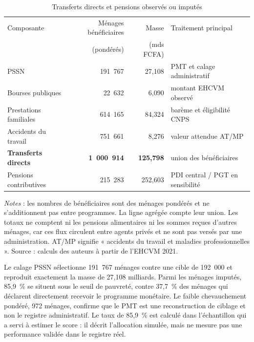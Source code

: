 \documentclass[11pt,a4paper]{article}
\begin{document}
\begin{table}[t]
\centering
\begin{threeparttable}
\caption{Transferts directs et pensions observés ou imputés}
\label{tab:transfers}
\small
\begin{tabular}{lrrl}
\toprule
Composante & Ménages bénéficiaires & Masse & Traitement principal \\
           & (pondérés) & (mds FCFA) & \\
\midrule
PSSN                       & 191~767 &  27,108 & PMT et calage administratif \\
Bourses publiques          &  22~632 &   6,090 & montant EHCVM observé \\
Prestations familiales     & 614~165 &  84,324 & barème et éligibilité CNPS \\
Accidents du travail       & 751~661 &   8,276 & valeur attendue AT/MP \\
\textbf{Transferts directs} & \textbf{1~000~914} & \textbf{125,798} & union des bénéficiaires \\
Pensions contributives     & 215~283 & 252,603 & PDI central / PGT en sensibilité \\
\bottomrule
\end{tabular}
\begin{tablenotes}\footnotesize
\item \emph{Notes} : les nombres de bénéficiaires sont des ménages pondérés et
ne s'additionnent pas entre programmes. La ligne agrégée compte leur union. Les
totaux ne comptent ni les pensions alimentaires ni les sommes reçues d'autres
ménages, car ces flux circulent entre agents privés et ne sont pas versés par
une administration. AT/MP signifie
« accidents du travail et maladies professionnelles ». Source : calculs des auteurs à partir de l'EHCVM 2021.
\end{tablenotes}
\end{threeparttable}
\end{table}

Le calage PSSN sélectionne 191~767 ménages contre une cible de 192~000 et
reproduit exactement la masse de 27,108 milliards. Parmi les ménages imputés,
85,9~\% se situent sous le seuil de pauvreté, contre 37,7~\% des ménages qui
déclarent directement recevoir le programme monétaire. Le faible chevauchement
pondéré, 972 ménages, confirme que le PMT est une reconstruction de ciblage et
non le registre administratif. Le taux de 85,9~\% est calculé dans l'échantillon
qui a servi à estimer le score : il décrit l'allocation simulée, mais ne mesure
pas une performance validée dans le registre réel.
\end{document}
